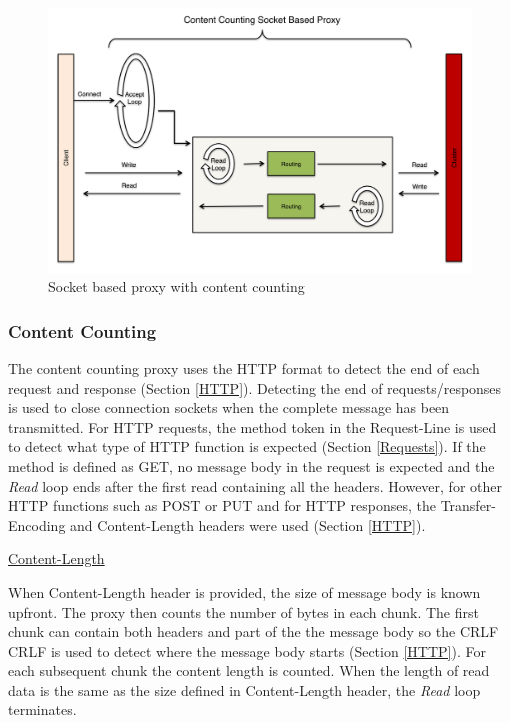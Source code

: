\documentclass[a4paper,11pt,twoside]{report}
\begin{document}
\begin{figure}[!ht]
  \centering
     \includegraphics[scale=0.31]{content_counting_proxy}
  \caption{Socket based proxy with content counting}
  \label{content_counting_proxy}
\end{figure}

\subsubsection*{Content Counting}
The content counting proxy uses the HTTP format to detect the end of each request and response (Section \ref{HTTP}). Detecting the end of requests/responses is used to close connection sockets when the complete message has been transmitted.   For HTTP requests, the method token in the Request-Line is used to detect what type of HTTP function is expected (Section \ref{Requests}). If the method is defined as GET, no message body in the request is expected and the \textit{Read} loop ends after the first read containing all the headers. However, for other HTTP functions such as POST or PUT and for HTTP responses, the Transfer-Encoding and Content-Length headers were used (Section \ref{HTTP}).\medskip 

\noindent
\underline{Content-Length}\medskip

\noindent
When Content-Length header is provided, the size of message body is known upfront.  The proxy then counts the number of bytes in each chunk.  The first chunk can contain both headers and part of the the message body so the CRLF CRLF is used to detect where the message body starts (Section \ref{HTTP}). For each subsequent chunk the content length is counted. When the length of read data is the same as the size defined in Content-Length header, the \textit{Read} loop terminates.\medskip 
\end{document}
